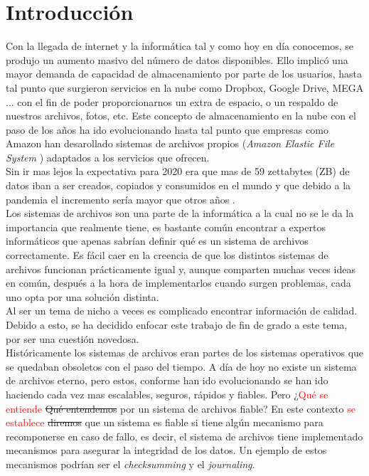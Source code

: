 \cleardoublepage
\clearpage{}
\chapter{Introducción}
Con la llegada de internet y la informática tal y como hoy en día conocemos, se produjo un aumento masivo del número de datos disponibles. Ello implicó una mayor demanda de capacidad de almacenamiento por parte de los usuarios, hasta tal punto que surgieron servicios en la nube como Dropbox, Google Drive, MEGA ... con el fin de poder proporcionarnos un extra de espacio, o un respaldo de nuestros archivos, fotos, etc. Este concepto de almacenamiento en la nube con el paso de los años ha ido evolucionando hasta tal punto que empresas como Amazon han desarollado sistemas de archivos propios (\textit{Amazon Elastic File System} \cite{amazon})  adaptados a los servicios que ofrecen.\\

Sin ir mas lejos la expectativa para 2020 era que mas de 59 zettabytes (ZB) de datos iban a ser creados, copiados y consumidos en el mundo y que debido a la pandemia el incremento sería mayor que otros años \cite{icb}. \\



Los sistemas de archivos son una parte de la informática a la cual no se le da la importancia que realmente tiene, es bastante común encontrar a expertos informáticos que apenas sabrían definir qué es un sistema de archivos correctamente. Es fácil caer en la creencia de que los distintos sistemas de archivos funcionan prácticamente igual y, aunque comparten muchas veces ideas en común, después a la hora de implementarlos cuando surgen problemas, cada uno opta por una solución distinta.\\

Al ser un tema de nicho a veces es complicado encontrar información de calidad. Debido a esto, se ha decidido enfocar este trabajo de fin de grado a este tema, por ser una cuestión novedosa.\\


Históricamente los sistemas de archivos eran partes de los sistemas operativos que se quedaban obsoletos con el paso del tiempo. A día de hoy no existe un sistema de archivos eterno, pero estos, conforme han ido evolucionando se han ido haciendo cada vez mas escalables, seguros, rápidos y fiables. Pero ¿\textcolor{red}{Qué se entiende} \sout{Qué entendemos} por un sistema de archivos fiable? En este contexto \textcolor{red}{se establece} \sout{diremos} que un sistema es fiable si tiene algún mecanismo para recomponerse en caso de fallo, es decir, el sistema de archivos tiene implementado mecanismos para asegurar la integridad de los datos. Un ejemplo de estos mecanismos podrían ser el \textit{checksumming} y el \textit{journaling}.\\

